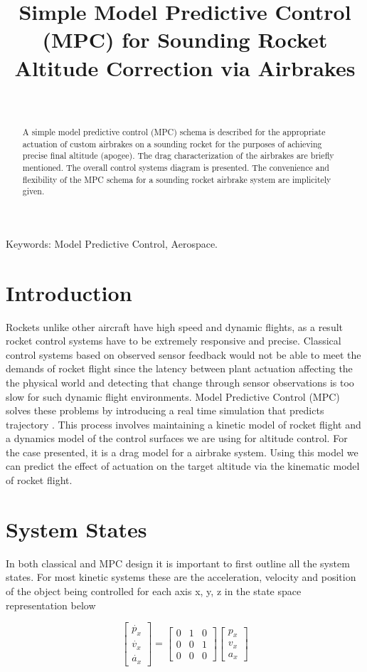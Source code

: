 \documentclass[conference, letterpaper]{IEEEtran}
\title{Simple Model Predictive Control (MPC) for Sounding Rocket Altitude Correction via Airbrakes}
\author{ \IEEEauthorblockN{Nikhil Peri, Anthony Lin, Manit Ginoya, Paul Buzuloiu} \
\IEEEauthorblockA{uOttawa Rocketry Team \\ \{nperi104, alin102
mgino015, pbuzu025\}@uottawa.ca} }
\begin{document}
\maketitle
\begin{abstract}
A simple model predictive control (MPC) schema is described for the appropriate
actuation of custom airbrakes on a sounding rocket for the purposes of achieving
precise final altitude (apogee). The drag characterization of the airbrakes are
briefly mentioned. The overall control systems diagram is presented. The
convenience and flexibility of the MPC schema for a sounding rocket airbrake
system are implicitely given.
\end{abstract}
\vspace{5mm}
Keywords: Model Predictive Control, Aerospace.

\section{Introduction}
Rockets unlike other aircraft have high speed and dynamic flights, as a result
rocket control systems have to be extremely responsive and precise. Classical
control systems based on observed sensor feedback would not be able to meet the
demands of rocket flight since the latency between plant actuation affecting the
the physical world and detecting that change through sensor observations is too
slow for such dynamic flight environments. Model Predictive Control (MPC) solves
these problems by introducing a real time simulation that predicts trajectory \citep{7330732}.
This process involves maintaining a kinetic model of rocket flight and a
dynamics model of the control surfaces we are using for altitude control.
For the case presented, it is a drag model for a airbrake system.
Using this model we can predict the effect of actuation on the target altitude
via the kinematic model of rocket flight.

\section{System States}
In both classical and MPC design it is important to first outline all the system states.
For most kinetic systems these are the acceleration, velocity and position of the object
being controlled for each axis x, y, z in the state space representation below

\begin{equation}\label{eq:1}
\begin{bmatrix}\dot{p_x} \\ \dot{v_x} \\ \dot{a_x} \end{bmatrix} =
\begin{bmatrix} 0 & 1 & 0 \\ 0 & 0 & 1 \\ 0 & 0 & 0 \end{bmatrix}
\begin{bmatrix}p_x\\v_x\\a_x\end{bmatrix}
\end{equation}
\end{document}
